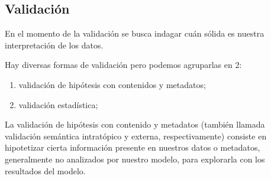 \documentclass[
]{book}
\newenvironment{Shaded}{\begin{snugshade}}{\end{snugshade}}
\newcommand{\AttributeTok}[1]{\textcolor[rgb]{0.77,0.63,0.00}{#1}}
\newcommand{\CommentTok}[1]{\textcolor[rgb]{0.56,0.35,0.01}{\textit{#1}}}
\newcommand{\DecValTok}[1]{\textcolor[rgb]{0.00,0.00,0.81}{#1}}
\newcommand{\FloatTok}[1]{\textcolor[rgb]{0.00,0.00,0.81}{#1}}
\newcommand{\FunctionTok}[1]{\textcolor[rgb]{0.00,0.00,0.00}{#1}}
\newcommand{\NormalTok}[1]{#1}
\newcommand{\OtherTok}[1]{\textcolor[rgb]{0.56,0.35,0.01}{#1}}
\newcommand{\SpecialCharTok}[1]{\textcolor[rgb]{0.00,0.00,0.00}{#1}}
\providecommand{\tightlist}{%
  \setlength{\itemsep}{0pt}\setlength{\parskip}{0pt}}
\begin{document}
\begin{Shaded}
\end{Shaded}

\hypertarget{validaciuxf3n}{%
\subsection{Validación}\label{validaciuxf3n}}

En el momento de la validación se busca indagar cuán sólida es nuestra interpretación de los datos.

Hay diversas formas de validación pero podemos agruparlas en 2:

\begin{enumerate}
\def\labelenumi{\arabic{enumi}.}
\tightlist
\item
  validación de hipótesis con contenidos y metadatos;
\item
  validación estadística;
\end{enumerate}

La validación de hipótesis con contenido y metadatos (también llamada validación semántica intratópico y externa, respectivamente) consiste en hipotetizar cierta información presente en nuestros datos o metadatos, generalmente no analizados por nuestro modelo, para explorarla con los resultados del modelo.
\end{document}
